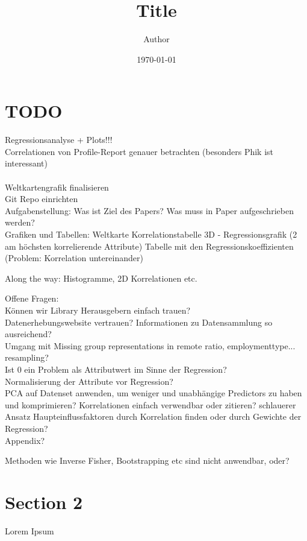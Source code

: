 \documentclass[11pt]{article}
\title{ Title}
\author{ Author }
\date{\today}
\begin{document}
\maketitle	
\pagebreak



\section{TODO}
Regressionsanalyse + Plots!!!\\
Correlationen von Profile-Report genauer betrachten (besonders Phik ist interessant)\\
\\    

Weltkartengrafik finalisieren\\
Git Repo einrichten\\

Aufgabenstellung: Was ist Ziel des Papers? Was muss in Paper aufgeschrieben werden?\\

Grafiken und Tabellen:
Weltkarte
Korrelationstabelle
3D - Regressionsgrafik (2 am höchsten korrelierende Attribute)
Tabelle mit den Regressionskoeffizienten (Problem: Korrelation untereinander)

Along the way: Histogramme, 2D Korrelationen etc. 


Offene Fragen:\\

Können wir Library Herausgebern einfach trauen?\\
Datenerhebungswebsite vertrauen? Informationen zu Datensammlung so ausreichend?\\
Umgang mit Missing group representations in remote ratio, employmenttype... resampling?\\
Ist 0 ein Problem als Attributwert im Sinne der Regression?\\
Normalisierung der Attribute vor Regression?\\
PCA auf Datenset anwenden, um weniger und unabhängige Predictors zu haben und komprimieren?
Korrelationen einfach verwendbar oder zitieren? schlauerer Ansatz
Haupteinflussfaktoren durch Korrelation finden oder durch Gewichte der Regression?\\
Appendix?

Methoden wie Inverse Fisher, Bootstrapping etc sind nicht anwendbar, oder?\\




\pagebreak
\section{Section 2}
Lorem Ipsum \\

\end{document}
